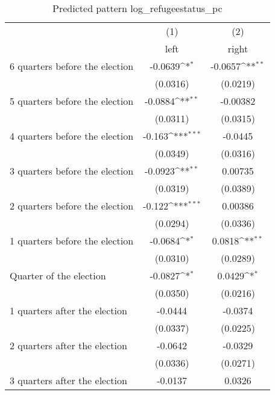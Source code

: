 \begin{table}[htbp]\centering
\def\sym#1{\ifmmode^{#1}\else\(^{#1}\)\fi}
\caption{Predicted pattern log\_refugeestatus\_pc}
\begin{tabular}{l*{2}{c}}
\hline\hline
                    &\multicolumn{1}{c}{(1)}&\multicolumn{1}{c}{(2)}\\
                    &\multicolumn{1}{c}{left}&\multicolumn{1}{c}{right}\\
\hline
 6 quarters before the election&     -0.0639\sym{*}  &     -0.0657\sym{**} \\
                    &    (0.0316)         &    (0.0219)         \\
[1em]
 5 quarters before the election&     -0.0884\sym{**} &    -0.00382         \\
                    &    (0.0311)         &    (0.0315)         \\
[1em]
 4 quarters before the election&      -0.163\sym{***}&     -0.0445         \\
                    &    (0.0349)         &    (0.0316)         \\
[1em]
 3 quarters before the election&     -0.0923\sym{**} &     0.00735         \\
                    &    (0.0319)         &    (0.0389)         \\
[1em]
 2 quarters before the election&      -0.122\sym{***}&     0.00386         \\
                    &    (0.0294)         &    (0.0336)         \\
[1em]
 1 quarters before the election&     -0.0684\sym{*}  &      0.0818\sym{**} \\
                    &    (0.0310)         &    (0.0289)         \\
[1em]
Quarter of the election&     -0.0827\sym{*}  &      0.0429\sym{*}  \\
                    &    (0.0350)         &    (0.0216)         \\
[1em]
 1 quarters after the election&     -0.0444         &     -0.0374         \\
                    &    (0.0337)         &    (0.0225)         \\
[1em]
 2 quarters after the election&     -0.0642         &     -0.0329         \\
                    &    (0.0336)         &    (0.0271)         \\
[1em]
 3 quarters after the election&     -0.0137         &      0.0326         \\

\end{tabular}
\end{table}
